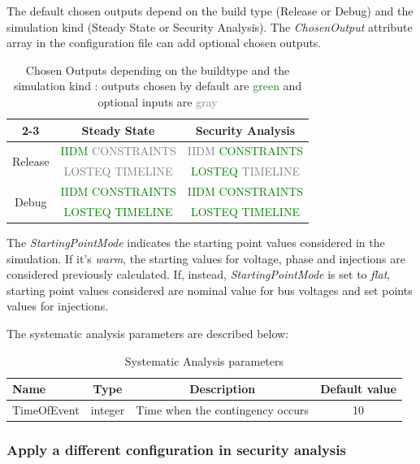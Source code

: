 \documentclass[a4paper, 12pt]{report}
\begin{document}
\begin{table}[H]
The default chosen outputs depend on the build type (Release or Debug) and the simulation kind (Steady State or Security Analysis). The \textit{ChosenOutput} attribute array in the configuration file can add optional chosen outputs.
\center
\begin{tabular}{| c | c | c |}
\cline{2-3}
\multicolumn{1}{c|}{} & Steady State & Security Analysis \\
\hline
\multirow{2}{*}{Release} & \textcolor{green}{\small{IIDM} \textcolor{gray}{CONSTRAINTS}} & \small{\textcolor{gray}{IIDM} \textcolor{green}{CONSTRAINTS}} \\
& \small{\textcolor{gray}{LOSTEQ}} \textcolor{gray}{TIMELINE} & \small{\textcolor{green}{LOSTEQ} \textcolor{gray}{TIMELINE}} \\
\hline
\multirow{2}{*}{Debug} & \textcolor{green}{\small{IIDM CONSTRAINTS}} & \textcolor{green}{\small{IIDM CONSTRAINTS}} \\
& \textcolor{green}{\small{LOSTEQ TIMELINE}} & \textcolor{green}{\small{LOSTEQ TIMELINE}} \\
\hline
\end{tabular}
\caption{Chosen Outputs depending on the buildtype and the simulation kind : outputs chosen by default are \textcolor{green}{green} and optional inputs are \textcolor{gray}{gray}}
\end{table}

The \textit{StartingPointMode} indicates the starting point values considered in the simulation. If it's \textit{warm}, the starting values for voltage, phase and injections are considered previously calculated.
If, instead, \textit{StartingPointMode} is set to \textit{flat}, starting point values considered are nominal value for bus voltages and set points values for injections.

\begin{table}[H]
The systematic analysis parameters are described below:
\center
\begin{tabular}{ l | c | c | c }
\toprule
\textbf{{Name}} & \textbf{{Type}} & \textbf{{Description}} & \textbf{{Default value}}\\
\midrule
\rowcolor{white}
TimeOfEvent & integer & Time when the contingency occurs & 10 \\
\bottomrule
\end{tabular}
\caption{Systematic Analysis parameters}
\end{table}


\subsubsection{Apply a different configuration in security analysis}
\end{document}
